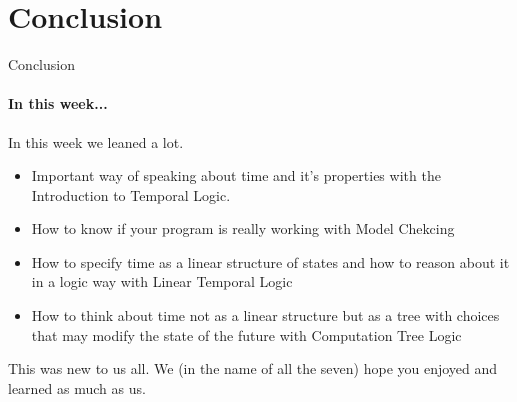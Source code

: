 \section{Conclusion}

\begin{frame}{Conclusion}
    \framesubtitle{In this week...}
    In this week we leaned a lot. 
    
    \begin{itemize}
        \item Important way of speaking about time and it's properties  with the Introduction to Temporal Logic. \pause
        
        \item How to know if your program is really working with Model Chekcing \pause
        
        \item How to specify time as a linear structure of states and how to reason about it in a logic way with Linear Temporal Logic \pause
        
        \item How to think about time not as a linear structure but as a tree with choices that may modify the state of the future with Computation Tree Logic \pause
    \end{itemize}
    
     This was new to us all. We (in the name of all the seven) hope you enjoyed and learned as much as us.
\end{frame}

